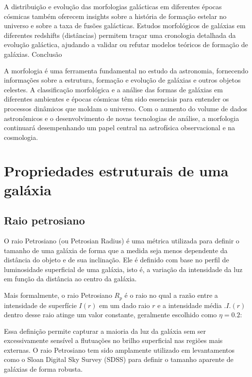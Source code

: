 A distribuição e evolução das morfologias galácticas em diferentes épocas cósmicas também oferecem insights sobre a história de formação estelar no universo e sobre a taxa de fusões galácticas. Estudos morfológicos de galáxias em diferentes redshifts (distâncias) permitem traçar uma cronologia detalhada da evolução galáctica, ajudando a validar ou refutar modelos teóricos de formação de galáxias.
Conclusão

A morfologia é uma ferramenta fundamental no estudo da astronomia, fornecendo informações sobre a estrutura, formação e evolução de galáxias e outros objetos celestes. A classificação morfológica e a análise das formas de galáxias em diferentes ambientes e épocas cósmicas têm sido essenciais para entender os processos dinâmicos que moldam o universo. Com o aumento do volume de dados astronômicos e o desenvolvimento de novas tecnologias de análise, a morfologia continuará desempenhando um papel central na astrofísica observacional e na cosmologia.



\section{Propriedades estruturais de uma galáxia}

\subsection{Raio petrosiano}

O raio Petrosiano (ou Petrosian Radius) é uma métrica utilizada para definir o tamanho de uma galáxia de forma que a medida seja menos dependente da distância do objeto e de sua inclinação. Ele é definido com base no perfil de luminosidade superficial de uma galáxia, isto é, a variação da intensidade da luz em função da distância ao centro da galáxia.

Mais formalmente, o raio Petrosiano $R_p$ é o raio no qual a razão entre a intensidade de superfície $I(r)$ em um dado raio $r$ e a intensidade média $.I.(r)$ dentro desse raio atinge um valor constante, geralmente escolhido como $\eta=0.2$:

Essa definição permite capturar a maioria da luz da galáxia sem ser excessivamente sensível a flutuações no brilho superficial nas regiões mais externas. O raio Petrosiano tem sido amplamente utilizado em levantamentos como o Sloan Digital Sky Survey (SDSS) para definir o tamanho aparente de galáxias de forma robusta.


